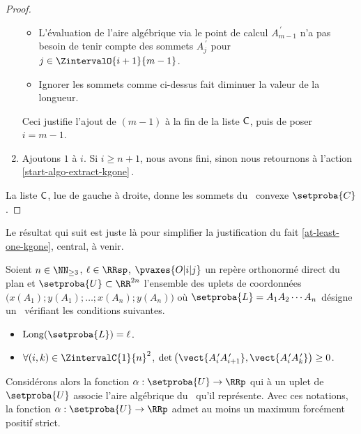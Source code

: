 \begin{proof}
\begin{enumerate}[label=\fbox{\small\bfseries\textsf{A\kern.25pt\arabic*}}]
\begin{itemize}
            \item L'évaluation de l'aire algébrique via le point de calcul $A^{\,\prime}_{m-1}$ n'a pas besoin de tenir compte des sommets $A^{\,\prime}_j$ pour $j \in \ZintervalO{i+1}{m-1}$.

            \item Ignorer les sommets comme ci-dessus fait diminuer la valeur de la longueur.
        \end{itemize}
        
        \noindent
        Ceci justifie l'ajout de $(m-1)$ à la fin de la liste $\mathsf{C}$, puis de poser $i = m-1$.

	
		\item \label{next-algo-extract-kgone}
		Ajoutons $1$ à $i$.
		Si $i \geq n+1$, nous avons fini, sinon nous retournons à l'action \ref{start-algo-extract-kgone}\,.
    \end{enumerate}
    
    \medskip
    
    La liste $\mathsf{C}$, lue de gauche à droite, donne les sommets du \kgone\ convexe $\setproba{C}$.
\end{proof}




%

Le résultat qui suit est juste là pour simplifier la justification du fait \ref{at-least-one-kgone}, central, à venir.


\begin{fact} \label{at-least-one-ncycle}
    Soient $n \in \NN_{\geq3}$,
    $\ell \in \RRsp$,
    $\pvaxes{O | i | j}$ un repère orthonormé direct du plan
    et
    $\setproba{U} \subset \RR^{2n}$ l'ensemble des uplets de coordonnées $\big( x(A_1) ; y(A_1) ; \dots ; x(A_n) ; y(A_n) \big)$ où $\setproba{L} = A_1 A_2 \cdots A_n$ désigne un \ncycle\ vérifiant les conditions suivantes.
    \begin{itemize}
        \item $\cyclelen{\setproba{L}} = \ell$.
    
        \item $\forall (i, k) \in \ZintervalC{1}{n}^2$,
		$\det \big( \vect{A^{\,\prime}_i A^{\,\prime}_{i+1}}, \vect{A^{\,\prime}_i A^{\,\prime}_k} \big) \geq 0$.
    \end{itemize}
    
    Considérons alors la fonction $\alpha: \setproba{U} \rightarrow \RRp$ qui à un uplet de $\setproba{U}$ associe l'aire algébrique du \ncycle\ qu'il représente.
	Avec ces notations, la fonction $\alpha: \setproba{U} \rightarrow \RRp$ admet au moins un maximum forcément positif strict.
\end{fact}


